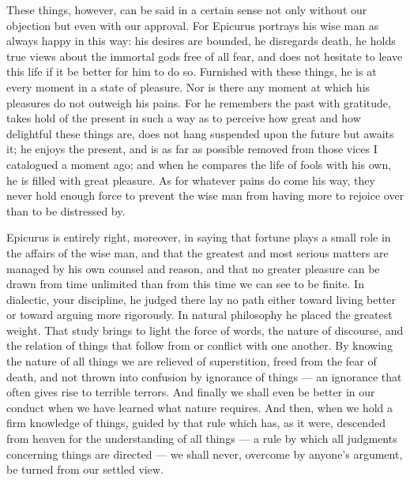  These things, however, can be said in a certain sense not only without our objection but even with our approval. For Epicurus portrays his wise man as always happy in this way: his desires are bounded, he disregards death, he holds true views about the immortal gods free of all fear, and does not hesitate to leave this life if it be better for him to do so. Furnished with these things, he is at every moment in a state of pleasure. Nor is there any moment at which his pleasures do not outweigh his pains. For he remembers the past with gratitude, takes hold of the present in such a way as to perceive how great and how delightful these things are, does not hang suspended upon the future but awaits it; he enjoys the present, and is as far as possible removed from those vices I catalogued a moment ago; and when he compares the life of fools with his own, he is filled with great pleasure. As for whatever pains do come his way, they never hold enough force to prevent the wise man from having more to rejoice over than to be distressed by.

 Epicurus is entirely right, moreover, in saying that fortune plays a small role in the affairs of the wise man, and that the greatest and most serious matters are managed by his own counsel and reason, and that no greater pleasure can be drawn from time unlimited than from this time we can see to be finite. In dialectic, your discipline, he judged there lay no path either toward living better or toward arguing more rigorously. In natural philosophy he placed the greatest weight. That study brings to light the force of words, the nature of discourse, and the relation of things that follow from or conflict with one another. By knowing the nature of all things we are relieved of superstition, freed from the fear of death, and not thrown into confusion by ignorance of things — an ignorance that often gives rise to terrible terrors. And finally we shall even be better in our conduct when we have learned what nature requires. And then, when we hold a firm knowledge of things, guided by that rule which has, as it were, descended from heaven for the understanding of all things — a rule by which all judgments concerning things are directed — we shall never, overcome by anyone's argument, be turned from our settled view.

